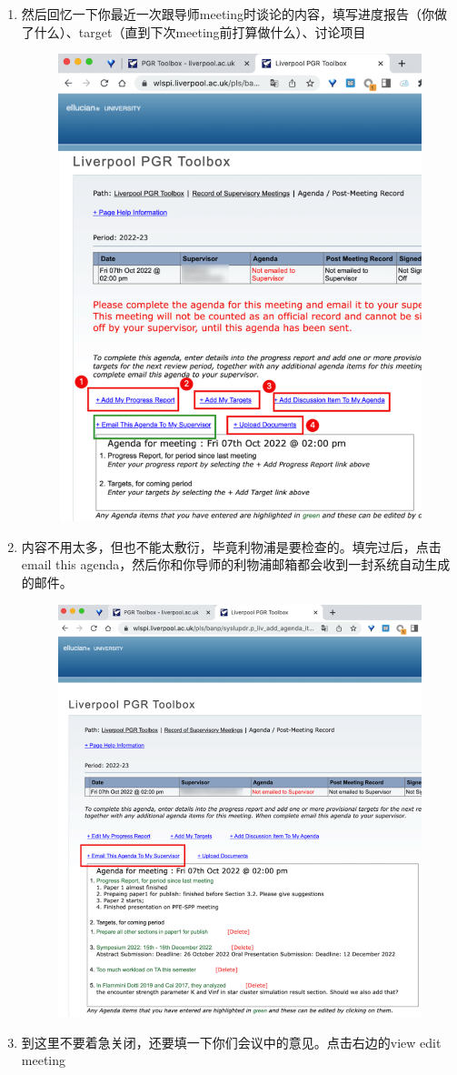 \begin{enumerate}
\begin{figure}[H]
    \end{figure}
    \item 然后回忆一下你最近一次跟导师meeting时谈论的内容，填写进度报告（你做了什么）、target（直到下次meeting前打算做什么）、讨论项目
    \begin{figure}[H]
        \centering
        \includegraphics[width=0.5\columnwidth]{author-folder/Kai.Wu/meeting_record_figures/add_items_to_meetings.png}
    \end{figure}
    \item 内容不用太多，但也不能太敷衍，毕竟利物浦是要检查的。填完过后，点击email this agenda，然后你和你导师的利物浦邮箱都会收到一封系统自动生成的邮件。
    \begin{figure}[H]
        \centering
        \includegraphics[width=0.5\columnwidth]{author-folder/Kai.Wu/meeting_record_figures/email_to.png}
    \end{figure}
    \item 到这里不要着急关闭，还要填一下你们会议中的意见。点击右边的view edit meeting
    \begin{figure}[H]

\end{figure}
\end{enumerate}
